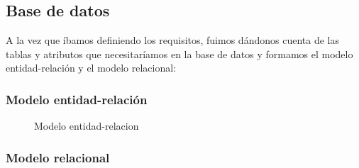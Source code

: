 \subsection{Base de datos}

A la vez que íbamos definiendo los requisitos, fuimos dándonos cuenta de las tablas y atributos que necesitaríamos en la base de datos y formamos el modelo entidad-relación y el modelo relacional:

\subsubsection{Modelo entidad-relación}

\begin{figure}
\begin{center}
\caption{Modelo entidad-relacion\label{fig:ent_rel}}
\end{center}
\end{figure}

\subsubsection{Modelo relacional}
\begin{center}
\end{center}

